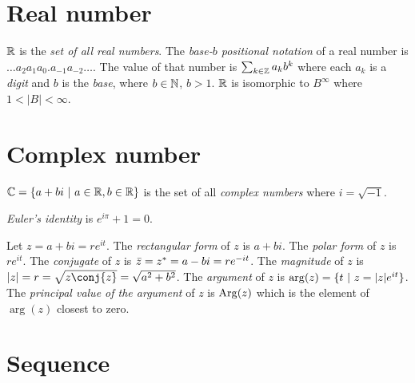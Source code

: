 \section{Real number}

%
%
%
%
\(\mathbb{R}\) is the \emph{set of all real numbers}.
The \emph{base-\(b\) positional notation} of a real number
is \(\ldots a_2 a_1 a_0 . a_{-1} a_{-2} \ldots\).
The value of that number is \(\sum_{k \in \mathbb{Z}} a_k b^k\)
where each \(a_k\) is a \emph{digit} and \(b\) is the \emph{base},
where \(b \in \mathbb{N}\), \(b > 1\).
\(\mathbb{R}\) is isomorphic to \(B^\infty\) where \(1 < |B| < \infty\).

\section{Complex number}

\(\mathbb{C} = \{ a + bi ~|~ a \in \mathbb{R}, b \in \mathbb{R} \}\)
is the set of all \emph{complex numbers} where \(i = \sqrt{-1}\).

%
\emph{Euler's identity} is \( e^{i \pi} + 1 = 0 \).

Let \(z = a+bi = re^{it}\).
%
%
The \emph{rectangular form} of \(z\) is \(a+bi\).
%
%
The \emph{polar form} of \(z\) is \(re^{it}\).
%
%
%
The \emph{conjugate} of \(z\) is \(\bar{z} = z^* = a-bi = re^{-it}\).
%
%
%
The \emph{magnitude} of \(z\) is \(\abs{z} = r = \sqrt{z\conj{z}} = \sqrt{a^2+b^2}\).
%
%
%
The \emph{argument} of \(z\) is \(\arg(z) = \{ t ~|~ z = |z| e^{it} \}\).
%
%
%
The \emph{principal value of the argument} of \(z\) is \(\mathrm{Arg}(z)\)
which is the element of \(\arg(z)\) closest to zero.

\section{Sequence}

